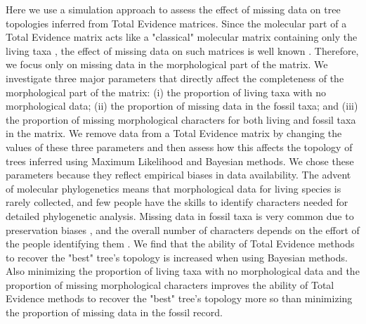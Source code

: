 \documentclass[12pt,letterpaper]{article}
\begin{document}
Here we use a simulation approach to assess the effect of missing data on tree topologies inferred from Total Evidence matrices. Since the molecular part of a Total Evidence matrix acts like a "classical" molecular matrix containing only the living taxa \citep{ronquista2012}, the effect of missing data on such matrices is well known \citep{wiensmissing2006,wiensmissing2008,rouresite-specific2011}. Therefore, we focus only on missing data in the morphological part of the matrix. We investigate three major parameters that directly affect the completeness of the morphological part of the matrix: (i) the proportion of living taxa with no morphological data; (ii) the proportion of missing data in the fossil taxa; and (iii) the proportion of missing morphological characters for both living and fossil taxa in the matrix. We remove data from a Total Evidence matrix by changing the values of these three parameters and then assess how this affects the topology of trees inferred using Maximum Likelihood and Bayesian methods. We chose these parameters because they reflect empirical biases in data availability. The advent of molecular phylogenetics means that morphological data for living species is rarely collected, and few people have the skills to identify characters needed for detailed phylogenetic analysis. Missing data in fossil taxa is very common due to preservation biases \citep{sansomfossilization2013}, and the overall number of characters depends on the effort of the people identifying them \citep[e.g.][]{O'Leary08022013}. We find that the ability of Total Evidence methods to recover the "best" tree's topology is increased when using Bayesian methods. Also minimizing the proportion of living taxa with no morphological data and the proportion of missing morphological characters improves the ability of Total Evidence methods to recover the "best" tree's topology more so than minimizing the proportion of missing data in the fossil record.

%
%
 
\newpage
\end{document}
